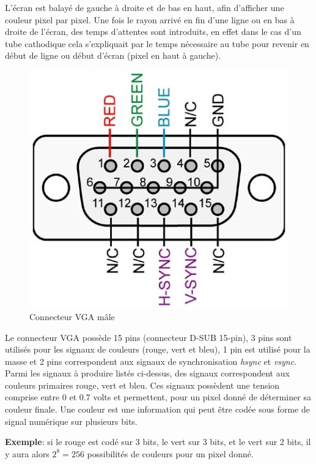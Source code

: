 L'écran est balayé de gauche à droite et de bas en haut, afin d'afficher une couleur pixel par pixel. Une fois le rayon arrivé en fin d'une ligne ou en bas à droite de l'écran, des temps d'attentes sont introduits, en effet dans le cas d'un tube cathodique cela s'expliquait par le temps nécessaire au tube pour revenir en début de ligne ou début d'écran (pixel en haut à gauche).\\

\begin{figure}[h!]
	\centering
	\includegraphics[scale=1.0]{images/vgapinout.jpg}
	\caption{Connecteur VGA mâle \cite{cite:vgapinout}}
	\label{fig:vgapinout}
\end{figure}

\newpage
Le connecteur VGA possède 15 pins (connecteur D-SUB 15-pin), 3 pins sont utilisés pour les signaux de couleurs (rouge, vert et bleu), 1 pin est utilisé pour la masse et 2 pins correspondent aux signaux de synchronisation \emph{hsync} et \emph{vsync}.\\

Parmi les signaux à produire listés ci-dessus, des signaux correspondent aux couleurs primaires rouge, vert et bleu. Ces signaux possèdent une tension comprise entre 0 et 0.7 volts et permettent, pour un pixel donné de déterminer sa couleur finale. Une couleur est une information qui peut être codée sous forme de signal numérique sur plusieurs bits.

\begin{snugshade}
\noindent \textbf{Exemple}: si le rouge est codé sur 3 bits, le vert sur 3 bits, et le vert sur 2 bits, il y aura alors $2^8 = 256$ possibilités de couleurs pour un pixel donné.
\end{snugshade}

